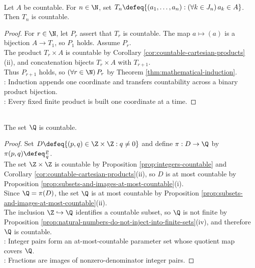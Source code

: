 \begin{theorem} \label{thm:finite-tuples-over-countable-set-countable} \\
Let $A$ be countable. For $n\in\N$, set $T_n\defeq\{(a_1,\ldots,a_n):(\forall k\in J_n)\,a_k\in A\}$. Then $T_n$ is countable.
\begin{proof}
For $r\in\N$, let $P_r$ assert that $T_r$ is countable. The map $a\mapsto(a)$ is a bijection $A\to T_1$, so $P_1$ holds. Assume $P_r$.\\
The product $T_r\times A$ is countable by Corollary \ref{cor:countable-cartesian-products}(ii), and concatenation bijects $T_r\times A$ with $T_{r+1}$.\\
Thus $P_{r+1}$ holds, so $(\forall r\in\N)\,P_r$ by Theorem \ref{thm:mathematical-induction}.\\
: Induction appends one coordinate and transfers countability across a binary product bijection.\\
: Every fixed finite product is built one coordinate at a time.
\end{proof}
\end{theorem}

\begin{corollary} \label{cor:rationals-countable} \\
The set $\Q$ is countable.
\begin{proof}
Set $D\defeq\{(p,q)\in\Z\times\Z:q\neq0\}$ and define $\pi:D\to\Q$ by $\pi(p,q)\defeq\frac{p}{q}$.\\
The set $\Z\times\Z$ is countable by Proposition \ref{prop:integers-countable} and Corollary \ref{cor:countable-cartesian-products}(ii), so $D$ is at most countable by Proposition \ref{prop:subsets-and-images-at-most-countable}(i).\\
Since $\Q=\pi(D)$, the set $\Q$ is at most countable by Proposition \ref{prop:subsets-and-images-at-most-countable}(ii).\\
The inclusion $\Z\hookrightarrow\Q$ identifies a countable subset, so $\Q$ is not finite by Proposition \ref{prop:natural-numbers-do-not-inject-into-finite-sets}(iv), and therefore $\Q$ is countable.\\
: Integer pairs form an at-most-countable parameter set whose quotient map covers $\Q$.\\
: Fractions are images of nonzero-denominator integer pairs.
\end{proof}
\end{corollary}

